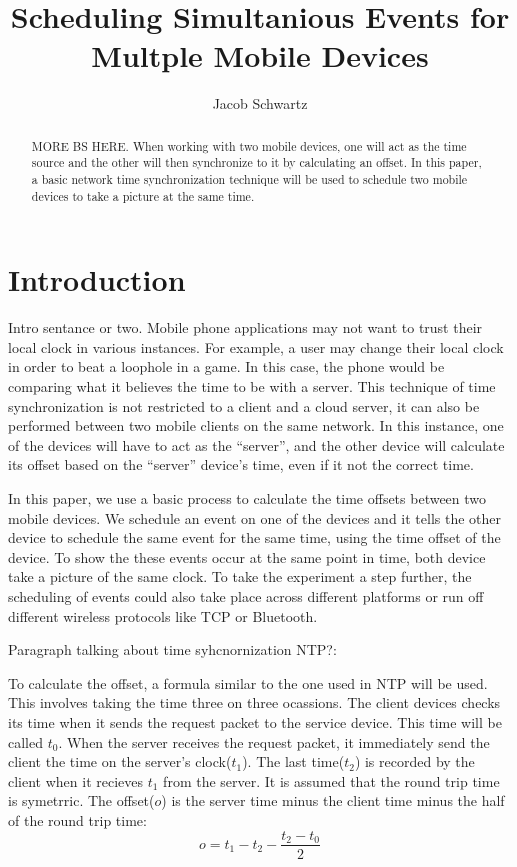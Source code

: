 \documentclass[10pt]{IEEEtran}
\begin{document}
\title{Scheduling Simultanious Events for Multple Mobile Devices}
\author{Jacob Schwartz}
\maketitle

\begin{abstract}
MORE BS HERE.
When working with two mobile devices, one will act as the time source and the
other will then synchronize to it by calculating an offset. In this paper, a
basic network time synchronization technique will be used to schedule two mobile
devices to take a picture at the same time.
\end{abstract}

\section{Introduction}

Intro sentance or two. 
Mobile phone applications may not want to trust their
local clock in various instances. For example, a user may change their local
clock in order to beat a loophole in a game. In this case, the phone would be
comparing what it believes the time to be with a server. This technique of time
synchronization is not restricted to a client and a cloud server, it can also be
performed between two mobile clients on the same network. In this instance, one
of the devices will have to act as the ``server'', and the other device will
calculate its offset based on the ``server'' device's time, even if it not the
correct time.

In this paper, we use a basic process to calculate the time offsets between two
mobile devices. We schedule an event on one of the devices and it tells the
other device to schedule the same event for the same time, using the time offset
of the device. To show the these events occur at the same point in time, both
device take a picture of the same clock. To take the experiment a step further,
the scheduling of events could also take place across different platforms or run
off different wireless protocols like TCP or Bluetooth.

Paragraph talking about time syhcnornization NTP?:

To calculate the offset, a formula similar to the one used in NTP will be used.
This involves taking the time three on three ocassions. The client devices
checks its time when it sends the request packet to the service device. This
time will be called $t_0$. When the server receives the request packet, it
immediately send the client the time on the server's clock($t_1$). The last
time($t_2$) is recorded by the client when it recieves $t_1$ from the server. 
It is assumed that the round trip time is symetrric. The offset($o$) is the
server time minus the client time minus the half of the round trip time:
\begin{equation}
    o = t_1 - t_2 - \frac{t_2 - t_0}{2} 
\end{equation}
\end{document}
